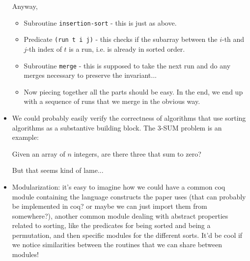 \begin{itemize}
Anyway, 
\begin{itemize}
	\item Subroutine \verb|insertion-sort| - this is just as above.
	\item Predicate \verb|(run t i j)| - this checks if the subarray between the $i$-th and $j$-th index of $t$ is a run, i.e. is already in sorted order.
	\item Subroutine \verb|merge| - this is supposed to take the next run and do any merges necessary to preserve the invariant...
	\item Now piecing together all the parts should be easy. In the end, we end up with a sequence of runs that we merge in the obvious way.
\end{itemize}
	\item We could probably easily verify the correctness of algorithms that use sorting algorithms as a substantive building block. The \textsc{3-SUM} problem is an example: 
	\begin{problem}
	\label{prob:}
	Given an array of $n$ integers, are there three that sum to zero?
\end{problem}
But that seems kind of lame...

\item Modularization: it's easy to imagine how we could have a common coq module containing the language constructs the paper uses (that can probably be implemented in coq? or maybe we can just import them from somewhere?), another common module dealing with abstract properties related to sorting, like the predicates for being sorted and being a permutation, and then specific modules for the different sorts. It'd be cool if we notice similarities between the routines that we can share between modules!
\end{itemize}




\nocite{*}  
